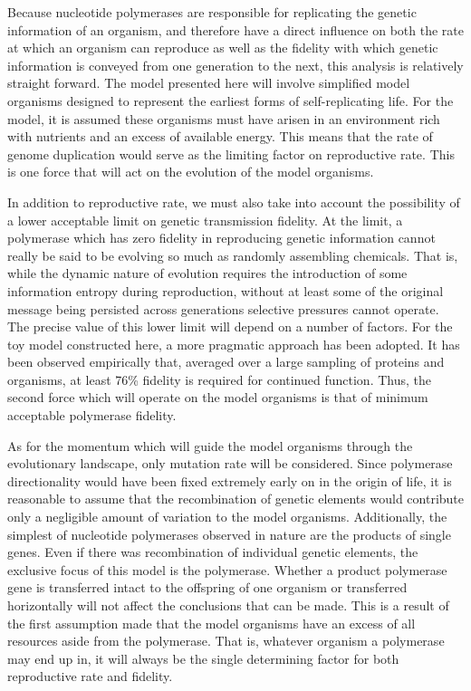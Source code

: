 Because nucleotide polymerases are responsible for replicating the genetic information of an organism, and therefore have a direct influence on both the rate at which an organism can reproduce as well as the fidelity with which genetic information is conveyed from one generation to the next, this analysis is relatively straight forward. The model presented here will involve simplified model organisms designed to represent the earliest forms of self-replicating life. For the model, it is assumed these organisms must have arisen in an environment rich with nutrients and an excess of available energy. This means that the rate of genome duplication would serve as the limiting factor on reproductive rate. This is one force that will act on the evolution of the model organisms.

In addition to reproductive rate, we must also take into account the possibility of a lower acceptable limit on genetic transmission fidelity. At the limit, a polymerase which has zero fidelity in reproducing genetic information cannot really be said to be evolving so much as randomly assembling chemicals. That is, while the dynamic nature of evolution requires the introduction of some information entropy during reproduction, without at least some of the original message being persisted across generations selective pressures cannot operate. The precise value of this lower limit will depend on a number of factors. For the toy model constructed here, a more pragmatic approach has been adopted. It has been observed empirically that, averaged over a large sampling of proteins and organisms, at least 76\% fidelity is required for continued function. Thus, the second force which will operate on the model organisms is that of minimum acceptable polymerase fidelity.

As for the momentum which will guide the model organisms through the evolutionary landscape, only mutation rate will be considered. Since polymerase directionality would have been fixed extremely early on in the origin of life, it is reasonable to assume that the recombination of genetic elements would contribute only a negligible amount of variation to the model organisms. Additionally, the simplest of nucleotide polymerases observed in nature are the products of single genes. Even if there was recombination of individual genetic elements, the exclusive focus of this model is the polymerase. Whether a product polymerase gene is transferred intact to the offspring of one organism or transferred horizontally will not affect the conclusions that can be made. This is a result of the first assumption made that the model organisms have an excess of all resources aside from the polymerase. That is, whatever organism a polymerase may end up in, it will always be the single determining factor for both reproductive rate and fidelity.
